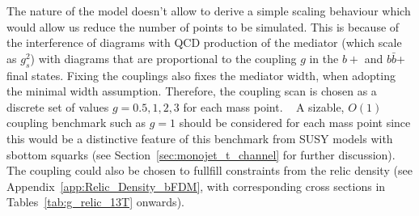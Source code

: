 The nature of the model doesn't allow to derive a simple scaling behaviour which would allow us reduce the number of points to be simulated. This is because of the interference of diagrams with QCD production of the mediator (which scale as $g^2_s$) with diagrams that are proportional to the coupling $g$ in the $b+$\MET{} and $b\bar{b}$+\MET{} final states. Fixing the couplings also fixes the mediator width, when adopting the minimal width assumption. 
Therefore, the coupling scan is chosen as a discrete set of values $g=0.5,1,2,3$ for each mass point.
~
A sizable, $O(1)$ coupling benchmark such as $g=1$ should be considered for each mass point since this would be a distinctive feature of this benchmark from SUSY models with sbottom squarks (see Section~\ref{sec:monojet_t_channel} for further discussion). The coupling could also be chosen to fullfill constraints from the relic density (see Appendix~\ref{app:Relic_Density_bFDM}, with corresponding cross sections in Tables~\ref{tab:g_relic_13T} onwards). 

